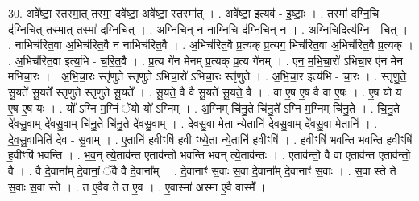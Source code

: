 \documentclass[17pt]{extarticle}
\begin{document}
30. अवे᳚ष्टा॒ स्तस्मा॒त् तस्मा॒ दवे᳚ष्टा॒ अवे᳚ष्टा॒ स्तस्मा᳚त् । . अवे᳚ष्टा॒ इत्यव॑ - इ॒ष्टाः॒ । . तस्मा॑ दग्नि॒चि द॑ग्नि॒चित् तस्मा॒त् तस्मा॑ दग्नि॒चित् । . अ॒ग्नि॒चिन् न नाग्नि॒चि द॑ग्नि॒चिन् न । . अ॒ग्नि॒चिदित्य॑ग्नि - चित् । . नाभिच॑रित॒वा अ॒भिच॑रित॒वै न नाभिच॑रित॒वै । . अ॒भिच॑रित॒वै प्र॒त्यक् प्र॒त्यग॒ भिच॑रित॒वा अ॒भिच॑रित॒वै प्र॒त्यक् । . अ॒भिच॑रित॒वा इत्य॒भि - च॒रि॒त॒वै । . प्र॒त्य गे॑न मेनम् प्र॒त्यक् प्र॒त्य गे॑नम् । . ए॒न॒ म॒भि॒चा॒रो॑ ऽभिचा॒र ए॑न मेन मभिचा॒रः । . अ॒भि॒चा॒रः स्तृ॑णुते स्तृणुते ऽभिचा॒रो॑ ऽभिचा॒रः स्तृ॑णुते । . अ॒भि॒चा॒र इत्य॑भि - चा॒रः । . स्तृ॒णु॒ते॒ सू॒यते॑ सू॒यते᳚ स्तृणुते स्तृणुते सू॒यते᳚ । . सू॒यते॒ वै वै सू॒यते॑ सू॒यते॒ वै । . वा ए॒ष ए॒ष वै वा ए॒षः । . ए॒ष यो य ए॒ष ए॒ष यः । . यो᳚ ऽग्नि म॒ग्निं ॅयो यो᳚ ऽग्निम् । . अ॒ग्निम् चि॑नु॒ते चि॑नु॒ते᳚ ऽग्नि म॒ग्निम् चि॑नु॒ते । . चि॒नु॒ते दे॑वसु॒वाम् दे॑वसु॒वाम् चि॑नु॒ते चि॑नु॒ते दे॑वसु॒वाम् । . दे॒व॒सु॒वा मे॒ता न्ये॒तानि॑ देवसु॒वाम् दे॑वसु॒वा मे॒तानि॑ । . दे॒व॒सु॒वामिति॑ देव - सु॒वाम् । . ए॒तानि॑ ह॒वीꣳषि॑ ह॒वी ꣳष्ये॒ता न्ये॒तानि॑ ह॒वीꣳषि॑ । . ह॒वीꣳषि॑ भवन्ति भवन्ति ह॒वीꣳषि॑ ह॒वीꣳषि॑ भवन्ति । . भ॒व॒न् त्ये॒ताव॑न्त ए॒ताव॑न्तो भवन्ति भवन् त्ये॒ताव॑न्तः । . ए॒ताव॑न्तो॒ वै वा ए॒ताव॑न्त ए॒ताव॑न्तो॒ वै । . वै दे॒वाना᳚म् दे॒वानां॒ ॅवै वै दे॒वाना᳚म् । . दे॒वानाꣳ॑ स॒वाः स॒वा दे॒वाना᳚म् दे॒वानाꣳ॑ स॒वाः । . स॒वा स्ते ते स॒वाः स॒वा स्ते । . त ए॒वैव ते त ए॒व । . ए॒वास्मा॑ अस्मा ए॒वै वास्मै᳚ । \newline
\end{document}
